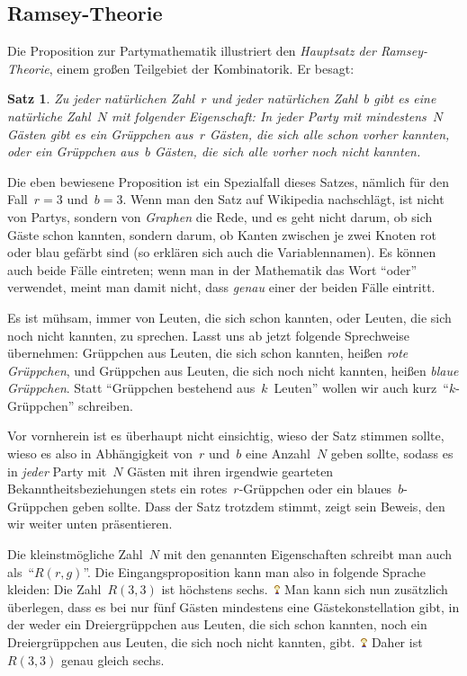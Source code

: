 \documentclass{../../zirkelblatt1718}
\theoremstyle{definition}
\theoremstyle{plain}
\newtheorem{satz}[defn]{Satz}
\theoremstyle{remark}
\newcommand{\happy}{\includegraphics[height=0.7em]{happy}\xspace}
\begin{document}
\subsection{Ramsey-Theorie}

Die Proposition zur Partymathematik illustriert den \emph{Hauptsatz der
Ramsey-Theorie}, einem großen Teilgebiet der Kombinatorik. Er besagt:

\begin{satz}Zu jeder natürlichen Zahl~$r$ und jeder natürlichen Zahl~$b$ gibt
es eine natürliche Zahl~$N$ mit folgender Eigenschaft: In jeder Party mit
mindestens~$N$ Gästen gibt es ein Grüppchen aus~$r$ Gästen, die sich alle schon
vorher kannten, oder ein Grüppchen aus~$b$ Gästen, die sich alle vorher noch
nicht kannten.
\end{satz}

Die eben bewiesene Proposition ist ein Spezialfall dieses Satzes, nämlich für
den Fall~$r = 3$ und~$b = 3$. Wenn man den Satz auf Wikipedia nachschlägt, ist
nicht von Partys, sondern von \emph{Graphen} die Rede, und es geht nicht darum,
ob sich Gäste schon kannten, sondern darum, ob Kanten zwischen je zwei Knoten
rot oder blau gefärbt sind (so erklären sich auch die Variablennamen). Es
können auch beide Fälle eintreten; wenn man in der Mathematik das Wort "`oder"'
verwendet, meint man damit nicht, dass \emph{genau} einer der beiden Fälle
eintritt.

Es ist mühsam, immer von Leuten, die sich schon kannten, oder Leuten, die sich
noch nicht kannten, zu sprechen. Lasst uns ab jetzt folgende Sprechweise
übernehmen: Grüppchen aus Leuten, die sich schon kannten, heißen \emph{rote
Grüppchen}, und Grüppchen aus Leuten, die sich noch nicht kannten, heißen
\emph{blaue Grüppchen}. Statt "`Grüppchen bestehend aus~$k$~Leuten"' wollen
wir auch kurz~"`$k$-Grüppchen"' schreiben.

Vor vornherein ist es überhaupt nicht einsichtig, wieso der Satz stimmen
sollte, wieso es also in Abhängigkeit von~$r$ und~$b$ eine Anzahl~$N$ geben
sollte, sodass es in \emph{jeder} Party mit~$N$ Gästen mit ihren irgendwie
gearteten Bekanntheitsbeziehungen stets ein rotes~$r$-Grüppchen oder ein
blaues~$b$-Grüppchen geben sollte. Dass der Satz trotzdem stimmt, zeigt sein
Beweis, den wir weiter unten präsentieren.

Die kleinstmögliche Zahl~$N$ mit den genannten Eigenschaften schreibt man auch
als~"`$R(r,g)$"'. Die Eingangsproposition kann man also in folgende Sprache
kleiden: Die Zahl~$R(3,3)$ ist höchstens sechs.~\happy Man kann sich nun zusätzlich
überlegen, dass es bei nur fünf Gästen mindestens eine Gästekonstellation gibt,
in der weder ein Dreiergrüppchen aus Leuten, die sich schon kannten, noch ein
Dreiergrüppchen aus Leuten, die sich noch nicht kannten, gibt.~\happy Daher
ist~$R(3,3)$ genau gleich sechs.
\end{document}
